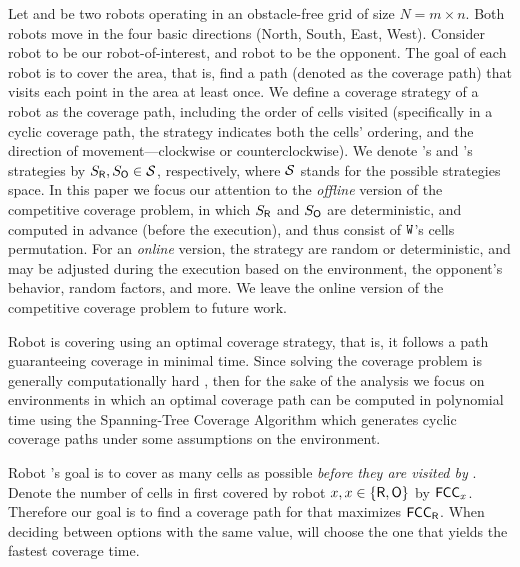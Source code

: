 Let \rob and \opp be two robots operating in an obstacle-free grid \w of size $N=m \times n$. Both robots move in the four basic directions (North, South, East, West). Consider robot \rob to be our robot-of-interest, and robot \opp to be the opponent. 
The goal of each robot is to cover the area, that is, find a path (denoted as the coverage path) that visits  each point in the area at least once. We define a coverage strategy of a robot as the coverage path, including the order of cells visited (specifically in a cyclic coverage path, the strategy indicates both the cells' ordering, and the direction of movement---clockwise or counterclockwise). We denote \rob's and \opp's strategies by $S_{{\sf R}},S_{{\sf O}}\in \mathcal{S}$, respectively, where $\cal{S}$ stands for the possible strategies space. In this paper we focus our attention to the {\em offline} version of the competitive coverage problem, in which $S_{{\sf R}}$ and $S_{{\sf O}}$ are deterministic, and computed in advance (before the execution), and thus consist of ${{\texttt W}}$'s cells permutation. For an {\em online} version, the strategy are random or deterministic, and may be adjusted during the execution based on the environment, the opponent's behavior, random factors, and more. We leave the online version of the competitive coverage problem to future work.


Robot \opp is covering \w using an optimal coverage strategy, that is, it follows a path guaranteeing coverage in minimal time.
Since solving the coverage problem is generally computationally hard \cite{arkin2000approximation}, then for the sake of the analysis we focus on environments in which an optimal coverage path can be computed in polynomial time using the Spanning-Tree Coverage Algorithm \cite{gabriely2001spanning} which generates cyclic coverage paths under some assumptions on the environment. 



Robot \rob's goal is to cover as many cells as possible {\em before they are visited by \rob}. %
Denote the number of cells in \w first covered by robot $x, x \in \{ {{\sf R}}, {{\sf O}}\} $ by ${{\sf{FCC}}}_{x}$. Therefore our goal is to find a coverage path for \rob that maximizes ${{\sf{FCC}}}_{{{\sf R}}}$.
When deciding between options with the same \fcc value, \rob will choose the one that yields the fastest coverage time.%





